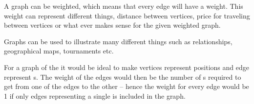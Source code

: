 A graph can be weighted, which means that every edge will have a weight.
This weight can represent different things, distance between vertices, price for traveling between vertices or what ever makes sense for the given weighted graph.

\begin{figure}[htb]
	\centering
		\hspace{0.02\textwidth}
		\hspace{0.02\textwidth}
		\caption{}
		\label{fig:cross}
\end{figure}

Graphs can be used to illustrate many different things such as relationships, geographical maps, tournaments etc.\cite[pp. 592-593]{Rosen07} 

For a graph of the \rubik{} it would be ideal to make vertices represent positions and edge represent \twist{}s. The weight of the edges would then be the number of \twist{}s required to get from one of the edges to the other -- hence the weight for every edge would be 1 if only edges representing a single \twist{} is included in the graph.

